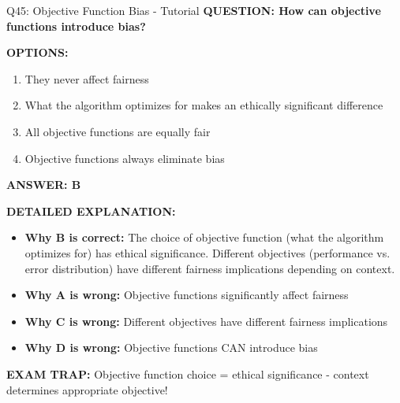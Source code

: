 \documentclass[8pt]{beamer}
\begin{document}
	\begin{frame}{Q45: Objective Function Bias - Tutorial}
		\fontsize{6.5}{7.5}\selectfont
		\textbf{QUESTION: How can objective functions introduce bias?}
		
		\vspace{0.1cm}
		\textbf{OPTIONS:}
		\begin{enumerate}
			\item They never affect fairness
			\item What the algorithm optimizes for makes an ethically significant difference
			\item All objective functions are equally fair
			\item Objective functions always eliminate bias
		\end{enumerate}
		
		\vspace{0.1cm}
		\textcolor{myblue}{\textbf{ANSWER: B}}
		
		\vspace{0.1cm}
		\textbf{DETAILED EXPLANATION:}
		\begin{itemize}
			\item \textbf{Why B is correct:} The choice of objective function (what the algorithm optimizes for) has ethical significance. Different objectives (performance vs. error distribution) have different fairness implications depending on context.
			\item \textbf{Why A is wrong:} Objective functions significantly affect fairness
			\item \textbf{Why C is wrong:} Different objectives have different fairness implications
			\item \textbf{Why D is wrong:} Objective functions CAN introduce bias
		\end{itemize}
		
		\textcolor{myred}{\textbf{EXAM TRAP:}} Objective function choice = \textcolor{myblue}{ethical significance} - context determines appropriate objective!
	\end{frame}
	
\end{document}
